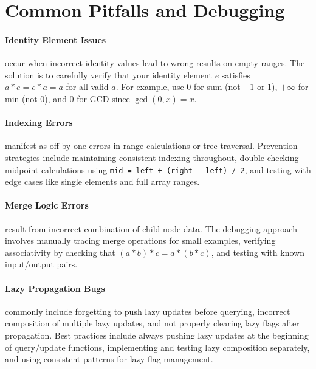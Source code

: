 \section{Common Pitfalls and Debugging}

\paragraph{Identity Element Issues} occur when incorrect identity values lead to wrong results on empty ranges. The solution is to carefully verify that your identity element $e$ satisfies $a \ast e = e \ast a = a$ for all valid $a$. For example, use $0$ for sum (not $-1$ or $1$), $+\infty$ for min (not $0$), and $0$ for GCD since $\gcd(0, x) = x$.

\paragraph{Indexing Errors} manifest as off-by-one errors in range calculations or tree traversal. Prevention strategies include maintaining consistent indexing throughout, double-checking midpoint calculations using \texttt{mid = left + (right - left) / 2}, and testing with edge cases like single elements and full array ranges.


\paragraph{Merge Logic Errors} result from incorrect combination of child node data. The debugging approach involves manually tracing merge operations for small examples, verifying associativity by checking that $(a \ast b) \ast c = a \ast (b \ast c)$, and testing with known input/output pairs.

\paragraph{Lazy Propagation Bugs} commonly include forgetting to push lazy updates before querying, incorrect composition of multiple lazy updates, and not properly clearing lazy flags after propagation. Best practices include always pushing lazy updates at the beginning of query/update functions, implementing and testing lazy composition separately, and using consistent patterns for lazy flag management.

